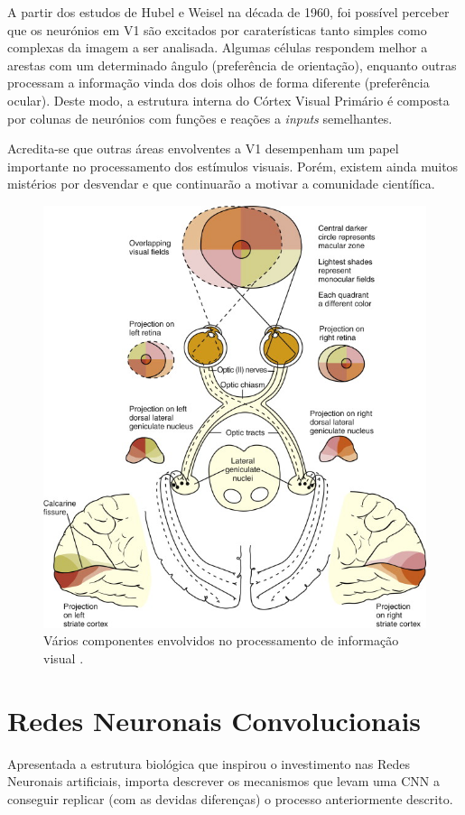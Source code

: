 \noindent A partir dos estudos de Hubel e Weisel na década de 1960, foi possível perceber que os neurónios em V1 são excitados por caraterísticas tanto simples como complexas da imagem a ser analisada. Algumas células respondem melhor a arestas com um determinado ângulo (preferência de orientação), enquanto outras processam a informação vinda dos dois olhos de forma diferente (preferência ocular). Deste modo, a estrutura interna do Córtex Visual Primário é composta por colunas de neurónios com funções e reações a \textit{inputs} semelhantes.

\noindent Acredita-se que outras áreas envolventes a V1 desempenham um papel importante no processamento dos estímulos visuais. Porém, existem ainda muitos mistérios por desvendar e que continuarão a motivar a comunidade científica.

\begin{figure}[h]
\centering
\includegraphics[width=325pt]{via_visual.jpg}
\caption{Vários componentes envolvidos no processamento de informação visual \cite{via_visual_primaria}.}
\label{fig:via_visual}
\end{figure}

\section{Redes Neuronais Convolucionais}
\label{chap2:sec:funcionamento}
Apresentada a estrutura biológica que inspirou o investimento nas Redes Neuronais artificiais, importa descrever os mecanismos que levam uma CNN a conseguir replicar (com as devidas diferenças) o processo anteriormente descrito. \newline


